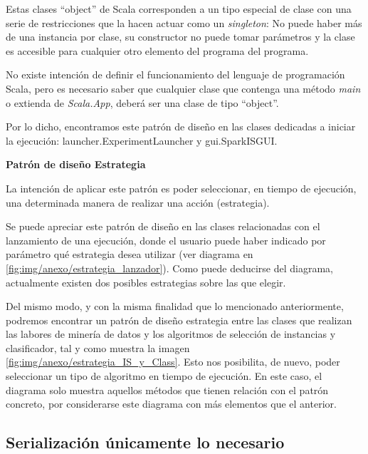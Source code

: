 Estas clases ``object'' de Scala corresponden a un tipo especial de clase con una serie de restricciones que la hacen actuar como un \textit{singleton}: No puede haber más de una instancia por clase, su constructor no puede tomar parámetros y la clase es accesible para cualquier otro elemento del programa del programa.

No existe intención de definir el funcionamiento del lenguaje de programación Scala, pero es necesario saber que cualquier clase que contenga una método \textit{main} o extienda de \textit{Scala.App}, deberá ser una clase de tipo ``object''.

Por lo dicho, encontramos este patrón de diseño en las clases dedicadas a iniciar la ejecución: launcher.ExperimentLauncher y gui.SparkISGUI.


\textbf{Patrón de diseño Estrategia}

La intención de aplicar este patrón es poder seleccionar, en tiempo de ejecución, una determinada manera de realizar una acción (estrategia).

Se puede apreciar este patrón de diseño en las clases relacionadas con el lanzamiento de una ejecución, donde el usuario puede haber indicado por parámetro qué estrategia desea utilizar (ver diagrama en \ref{fig:img/anexo/estrategia_lanzador}). Como puede deducirse del diagrama, actualmente existen dos posibles estrategias sobre las que elegir. 


Del mismo modo, y con la misma finalidad que lo mencionado anteriormente, podremos encontrar un patrón de diseño estrategia entre las clases que realizan las labores de minería de datos y los algoritmos de selección de instancias y clasificador, tal y como muestra la imagen \ref{fig:img/anexo/estrategia_IS_y_Class}. Esto nos posibilita, de nuevo, poder seleccionar un tipo de algoritmo en tiempo de ejecución. En este caso, el diagrama solo muestra aquellos métodos que tienen relación con el patrón concreto, por considerarse este diagrama con más elementos que el anterior.


\subsection{Serialización únicamente lo necesario}

